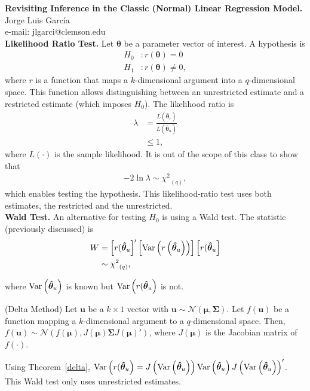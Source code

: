 
\let\counterwithout\relax
\let\counterwithin\relax
{}



\noindent \textbf{Revisiting Inference in the Classic (Normal) Linear Regression Model.}\\
\noindent Jorge Luis García \\
\noindent e-mail: jlgarci@clemson.edu\\

\noindent \textbf{Likelihood Ratio Test.} Let $\bm{\theta}$ be a parameter vector of interest. A hypothesis is
\begin{align}
	H_0 & : r \left( \bm{\theta} \right) = 0 \nonumber \\
	H_1 & : r \left( \bm{\theta} \right) \neq 0 \nonumber,
\end{align}
\noindent where $r$ is a function that maps a $k$-dimensional argument into a $q$-dimensional space. This function allows distinguishing between an unrestricted estimate and a restricted estimate (which imposes $H_0$). The likelihood ratio is
\begin{align}
	\lambda & = \frac{ L \left( \bm{\hat{\theta}}_r \right) } { L \left( \bm{\hat{\theta}}_u \right) } \nonumber \\ 
		    & \leq 1, 
\end{align}
\noindent where $L \left( \cdot \right)$ is the sample likelihood. It is out of the scope of this class to show that 
\begin{align}
	- 2 \ln \lambda \sim {\chi^2}_{(q)}, 
\end{align}
\noindent which enables testing the hypothesis. This likelihood-ratio test uses both estimates, the restricted and the unrestricted.\\

\noindent \noindent \textbf{Wald Test.} An alternative for testing $H_0$ is using a Wald test. The statistic (previously discussed) is 
\begin{align}
	W & = \left[ r ( \bm{\hat{\theta}}_u \right]' \left[ \operatorname{Var} \left( r \left( \bm{\hat{\theta}}_u \right) \right) \right] \left[ r ( \bm{\hat{\theta}}_u \right] \nonumber \\ 
	  & \sim {\chi^2}_{(q)}, 
\end{align}

\noindent where $\operatorname{Var} \left(  \bm{\hat{\theta}}_u \right)$ is known but $\operatorname{Var} \left( r ( \bm{\hat{\theta}}_u \right)$ is not. 

\begin{theorem} \label{delta} (Delta Method) Let $\bm{u}$ be a $k \times 1$ vector with $\bm{u} \sim \mathcal{N} \left( \bm{\mu}, \bm{\Sigma} \right)$. Let $f \left( \bm{u} \right)$ be a function mapping a $k$-dimensional argument to a $q$-dimensional space. Then, $f \left( \bm{u} \right) \sim \mathcal{N} \left( f \left( \bm{\mu} \right) , J \left( \bm{\mu} \right) \bm{\Sigma} J \left( \bm{\mu} \right)' \right)$, where $J \left( \bm{\mu} \right)$ is the Jacobian matrix of $f \left( \cdot \right)$. 
\end{theorem}

\noindent Using Theorem~\ref{delta}, $\operatorname{Var} \left( r ( \bm{\hat{\theta}}_u \right) = J \left( \operatorname{Var} \left(  \bm{\hat{\theta}}_u \right) \right) \operatorname{Var} \left(  \bm{\hat{\theta}}_u \right) J \left( \operatorname{Var} \left(  \bm{\hat{\theta}}_u \right) \right)'$. This Wald test only uses unrestricted estimates.

